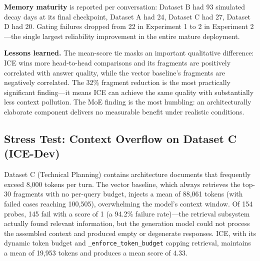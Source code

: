 \documentclass[10pt]{article}
\begin{document}
\textbf{Memory maturity} is reported per conversation: Dataset B had 93 simulated decay days at its final checkpoint, Dataset A had 24, Dataset C had 27, Dataset D had 20. Gating failures dropped from 22 in Experiment 1 to 2 in Experiment 2---the single largest reliability improvement in the entire mature deployment.

\textbf{Lessons learned.} The mean-score tie masks an important qualitative difference: ICE wins more head-to-head comparisons and its fragments are positively correlated with answer quality, while the vector baseline's fragments are negatively correlated. The 32\% fragment reduction is the most practically significant finding---it means ICE can achieve the same quality with substantially less context pollution. The MoE finding is the most humbling: an architecturally elaborate component delivers no measurable benefit under realistic conditions.

\subsection{Stress Test: Context Overflow on Dataset C (ICE-Dev)}
\label{sec:stress}

Dataset C (Technical Planning) contains architecture documents that frequently exceed 8{,}000 tokens per turn. The vector baseline, which always retrieves the top-30 fragments with no per-query budget, injects a mean of 88{,}061 tokens (with failed cases reaching 100{,}505), overwhelming the model's context window. Of 154 probes, 145 fail with a score of 1 (a 94.2\% failure rate)---the retrieval subsystem actually found relevant information, but the generation model could not process the assembled context and produced empty or degenerate responses. ICE, with its dynamic token budget and \texttt{\_enforce\_token\_budget} capping retrieval, maintains a mean of 19{,}953 tokens and produces a mean score of 4.33.
\end{document}
